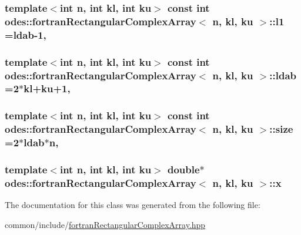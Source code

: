 \subsubsection[{l1}]{\setlength{\rightskip}{0pt plus 5cm}template$<$int n, int kl, int ku$>$ const int {\bf odes\+::fortran\+Rectangular\+Complex\+Array}$<$ n, kl, ku $>$\+::l1 ={\bf ldab}-\/1\hspace{0.3cm}{\ttfamily [static]}, {\ttfamily [private]}}\label{classodes_1_1fortranRectangularComplexArray_a0b1f7b8193f5ee24cfde0c6953aee714}
\hypertarget{classodes_1_1fortranRectangularComplexArray_a44b92ded1ed0bf332322a6f4ed439db5}{}
\subsubsection[{ldab}]{\setlength{\rightskip}{0pt plus 5cm}template$<$int n, int kl, int ku$>$ const int {\bf odes\+::fortran\+Rectangular\+Complex\+Array}$<$ n, kl, ku $>$\+::ldab =2$\ast$kl+ku+1\hspace{0.3cm}{\ttfamily [static]}, {\ttfamily [private]}}\label{classodes_1_1fortranRectangularComplexArray_a44b92ded1ed0bf332322a6f4ed439db5}
\hypertarget{classodes_1_1fortranRectangularComplexArray_a92dd60f10c597b14d4a38502ab291cba}{}
\subsubsection[{size}]{\setlength{\rightskip}{0pt plus 5cm}template$<$int n, int kl, int ku$>$ const int {\bf odes\+::fortran\+Rectangular\+Complex\+Array}$<$ n, kl, ku $>$\+::size =2$\ast${\bf ldab}$\ast$n\hspace{0.3cm}{\ttfamily [static]}, {\ttfamily [private]}}\label{classodes_1_1fortranRectangularComplexArray_a92dd60f10c597b14d4a38502ab291cba}
\hypertarget{classodes_1_1fortranRectangularComplexArray_a04409d9c6123c7ab97b2c9599ddec0cd}{}
\subsubsection[{x}]{\setlength{\rightskip}{0pt plus 5cm}template$<$int n, int kl, int ku$>$ double$\ast$ {\bf odes\+::fortran\+Rectangular\+Complex\+Array}$<$ n, kl, ku $>$\+::x\hspace{0.3cm}{\ttfamily [private]}}\label{classodes_1_1fortranRectangularComplexArray_a04409d9c6123c7ab97b2c9599ddec0cd}


The documentation for this class was generated from the following file\+:\begin{DoxyCompactItemize}
\item 
common/include/\hyperlink{fortranRectangularComplexArray_8hpp}{fortran\+Rectangular\+Complex\+Array.\+hpp}\end{DoxyCompactItemize}
